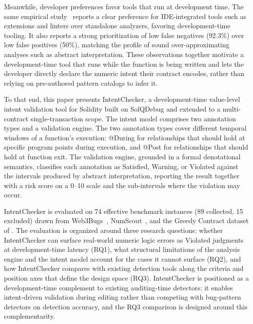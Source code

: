 \documentclass[pdflatex,sn-basic]{sn-jnl}%
\theoremstyle{thmstyleone}%
\theoremstyle{thmstyletwo}%
\theoremstyle{thmstylethree}%
\begin{document}
Meanwhile, developer preferences favor tools that run at development time. The same empirical study~\citep{defisecurity} reports a clear preference for IDE-integrated tools such as extensions and linters over standalone analyzers, favoring development-time tooling. It also reports a strong prioritization of low false negatives (92.3\%) over low false positives (50\%), matching the profile of sound over-approximating analyses such as abstract interpretation.
These observations together motivate a development-time tool that runs while the function is being written and lets the developer directly declare the numeric intent their contract encodes, rather than relying on pre-authored pattern catalogs to infer it.

To that end, this paper presents IntentChecker, a development-time value-level intent validation tool for Solidity built on SolQDebug and extended to a multi-contract single-transaction scope.
The intent model comprises two annotation types and a validation engine. The two annotation types cover different temporal windows of a function's execution: @During for relationships that should hold at specific program points during execution, and @Post for relationships that should hold at function exit. The validation engine, grounded in a formal denotational semantics, classifies each annotation as Satisfied, Warning, or Violated against the intervals produced by abstract interpretation, reporting the result together with a risk score on a 0--10 scale and the sub-intervals where the violation may occur.

IntentChecker is evaluated on 74 effective benchmark instances (89 collected, 15 excluded) drawn from Web3Bugs~\citep{exploitablebugs}, NumScout~\citep{numscout}, and the Greedy Contract dataset of \citet{flyinointment}.
The evaluation is organized around three research questions: whether IntentChecker can surface real-world numeric logic errors as Violated judgments at development-time latency (RQ1), what structural limitations of the analysis engine and the intent model account for the cases it cannot surface (RQ2), and how IntentChecker compares with existing detection tools along the criteria and position axes that define the design space (RQ3).
IntentChecker is positioned as a development-time complement to existing auditing-time detectors: it enables intent-driven validation during editing rather than competing with bug-pattern detectors on detection accuracy, and the RQ3 comparison is designed around this complementarity.
\end{document}
